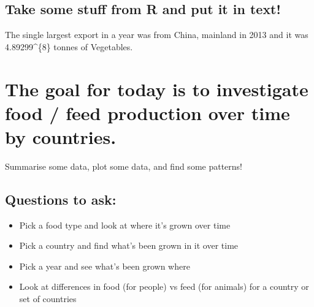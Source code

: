 \documentclass[]{article}
\newenvironment{Shaded}{\begin{snugshade}}{\end{snugshade}}
\newcommand{\KeywordTok}[1]{\textcolor[rgb]{0.13,0.29,0.53}{\textbf{{#1}}}}
\newcommand{\DataTypeTok}[1]{\textcolor[rgb]{0.13,0.29,0.53}{{#1}}}
\newcommand{\StringTok}[1]{\textcolor[rgb]{0.31,0.60,0.02}{{#1}}}
\newcommand{\CommentTok}[1]{\textcolor[rgb]{0.56,0.35,0.01}{\textit{{#1}}}}
\newcommand{\NormalTok}[1]{{#1}}
\providecommand{\tightlist}{%
  \setlength{\itemsep}{0pt}\setlength{\parskip}{0pt}}
\begin{document}
\subsection{Take some stuff from R and put it in
text!}\label{take-some-stuff-from-r-and-put-it-in-text}

\begin{Shaded}
\end{Shaded}

The single largest export in a year was from China, mainland in 2013 and
it was 4.89299\^{}\{8\} tonnes of Vegetables.

\section{The goal for today is to investigate food / feed production
over time by
countries.}\label{the-goal-for-today-is-to-investigate-food-feed-production-over-time-by-countries.}

Summarise some data, plot some data, and find some patterns!

\subsection{Questions to ask:}\label{questions-to-ask}

\begin{itemize}
\tightlist
\item
  Pick a food type and look at where it's grown over time
\item
  Pick a country and find what's been grown in it over time
\item
  Pick a year and see what's been grown where
\item
  Look at differences in food (for people) vs feed (for animals) for a
  country or set of countries
\end{itemize}
\end{document}
